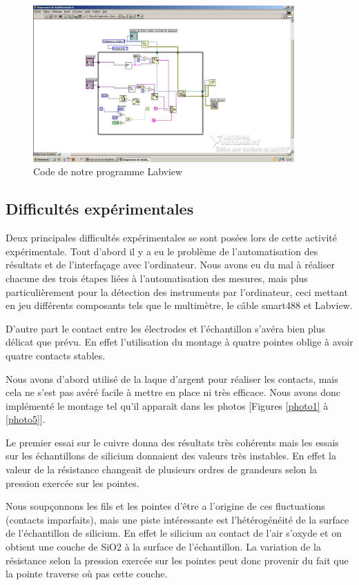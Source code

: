 \begin{figure}[!t]
  \begin{center}
		\includegraphics[height=6cm]{./images/labview.jpg}
		\caption{Code de notre programme Labview}
		\label{code_labview}
	\end{center}
\end{figure}


\subsection{Difficultés expérimentales}
Deux principales difficultés expérimentales se sont posées lors de cette activité expérimentale.
Tout d'abord il y a eu le problème de l'automatisation des résultats et de l'interfaçage avec l'ordinateur.
Nous avons eu du mal à réaliser chacune des trois étapes liées à l'automatisation des mesures, mais plus particulièrement 
pour la détection des instruments par l'ordinateur, ceci mettant en jeu différents composants tels que le 
multimètre, le câble smart488 et Labview.

D'autre part le contact entre les électrodes et l'échantillon s'avéra bien plus délicat que prévu. 
En effet l'utilisation du montage à quatre pointes oblige à avoir quatre contacts stables.

Nous avons d'abord utilisé de la laque d'argent pour réaliser les contacts, mais cela ne s'est pas avéré facile à mettre en place ni très efficace.
Nous avons donc implémenté le montage tel qu'il apparaît dans les photos [Figures \ref{photo1} à \ref{photo5}].

Le premier essai sur le cuivre donna des résultats 
très cohérents mais les essais sur les échantillons de silicium donnaient des valeurs très instables. 
En effet la valeur de la résistance changeait de plusieurs ordres de grandeurs selon la pression exercée sur les 
pointes.

Nous soupçonnons les fils et les pointes d'être a l'origine de ces fluctuations (contacts imparfaits), mais une piste intéressante est l'hétérogénéité de la surface de l'échantillon de silicium. 
En effet le silicium au contact de l'air s'oxyde et on obtient une couche de SiO2 à la surface de l'échantillon. 
La variation de la résistance selon la pression exercée sur les pointes peut donc provenir du fait que la pointe 
traverse où pas cette couche.

